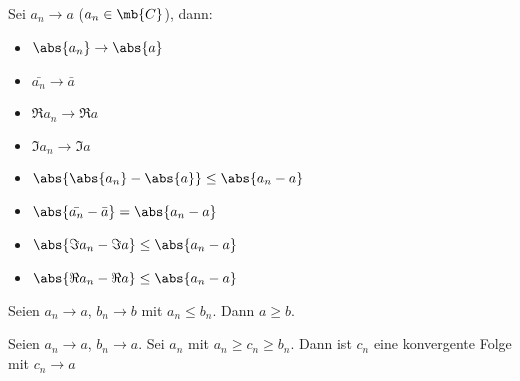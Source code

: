 \begin{Sat}
  Sei $a_n\to a$ ($a_n\in\mb{C}$), dann:
  \begin{itemize}
    \item $\abs{a_n}\to\abs{a}$
    \item $\bar{a_n}\to\bar{a}$
    \item $\Re a_n\to\Re a$
    \item $\Im a_n\to\Im a$
  \end{itemize}
\end{Sat}
\begin{Bew}
  \begin{itemize}
    \item $\abs{\abs{a_n}-\abs{a}}\leq \abs{a_n-a}$
    \item $\abs{\bar{a_n}-\bar{a}}= \abs{a_n-a}$
    \item $\abs{\Im a_n-\Im a}\leq \abs{a_n-a}$
    \item $\abs{\Re a_n-\Re a}\leq \abs{a_n-a}$
  \end{itemize}
\end{Bew}
\begin{Sat}
  Seien $a_n\to a$, $b_n\to b$ mit $a_n\leq b_n$. Dann $a\geq b$.
\end{Sat}
\begin{Kor}
  Seien $a_n\to a$, $b_n\to a$. Sei $a_n$ mit $a_n\geq c_n\geq b_n$. Dann ist $c_n$ eine konvergente Folge mit $c_n\to a$
\end{Kor}
